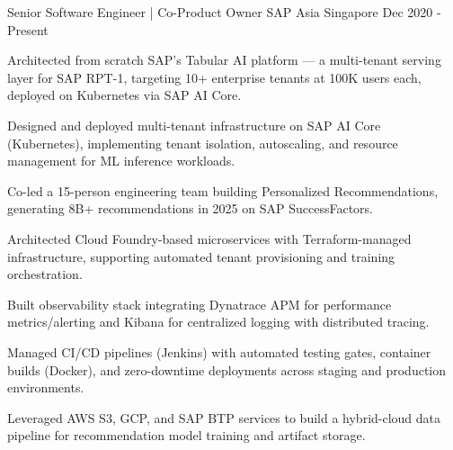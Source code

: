 

\begin{cventries}

  \cventry
    {Senior Software Engineer | Co-Product Owner} %
    {SAP Asia} %
    {Singapore} %
    {Dec 2020 - Present} %
    {
      \begin{cvitems} %
        \item {Architected from scratch SAP's Tabular AI platform — a multi-tenant serving layer for SAP RPT-1, targeting 10+ enterprise tenants at 100K users each, deployed on Kubernetes via SAP AI Core.}
        \item {Designed and deployed multi-tenant infrastructure on SAP AI Core (Kubernetes), implementing tenant isolation, autoscaling, and resource management for ML inference workloads.}
        \item {Co-led a 15-person engineering team building Personalized Recommendations, generating 8B+ recommendations in 2025 on SAP SuccessFactors.}
        \item {Architected Cloud Foundry-based microservices with Terraform-managed infrastructure, supporting automated tenant provisioning and training orchestration.}
        \item {Built observability stack integrating Dynatrace APM for performance metrics/alerting and Kibana for centralized logging with distributed tracing.}
        \item {Managed CI/CD pipelines (Jenkins) with automated testing gates, container builds (Docker), and zero-downtime deployments across staging and production environments.}
        \item {Leveraged AWS S3, GCP, and SAP BTP services to build a hybrid-cloud data pipeline for recommendation model training and artifact storage.}
      \end{cvitems}
    }


\end{cventries}
